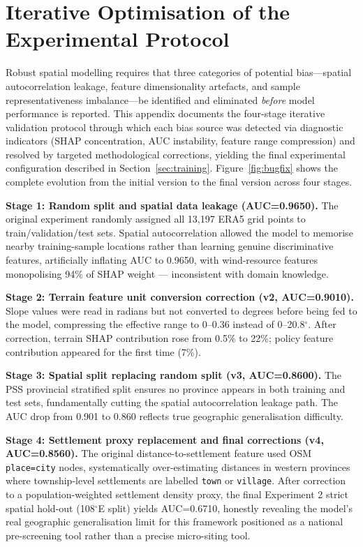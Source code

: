 \documentclass[12pt, a4paper]{article}
\begin{document}
\section{Iterative Optimisation of the Experimental Protocol}
\label{sec:appendix}

Robust spatial modelling requires that three categories of 
potential bias---spatial autocorrelation leakage, feature 
dimensionality artefacts, and sample representativeness 
imbalance---be identified and eliminated \textit{before} 
model performance is reported. This appendix documents the 
four-stage iterative validation protocol through which each 
bias source was detected via diagnostic indicators (SHAP 
concentration, AUC instability, feature range compression) 
and resolved by targeted methodological corrections, yielding 
the final experimental configuration described in 
Section~\ref{sec:training}.
Figure~\ref{fig:bugfix} shows the complete evolution from the
initial version to the final version across four stages.

\textbf{Stage 1: Random split and spatial data leakage
(AUC=0.9650).} The original experiment randomly assigned all
13,197 ERA5 grid points to train/validation/test sets.
Spatial autocorrelation allowed the model to memorise nearby
training-sample locations rather than learning genuine
discriminative features, artificially inflating AUC to 0.9650,
with wind-resource features monopolising 94\% of SHAP weight
--- inconsistent with domain knowledge.

\textbf{Stage 2: Terrain feature unit conversion correction
(v2, AUC=0.9010).} Slope values were read in radians but not
converted to degrees before being fed to the model, compressing
the effective range to 0--0.36 instead of 0--20.8$^\circ$.
After correction, terrain SHAP contribution rose from 0.5\%
to 22\%; policy feature contribution appeared for the first
time (7\%).

\textbf{Stage 3: Spatial split replacing random split
(v3, AUC=0.8600).} The PSS provincial stratified split ensures
no province appears in both training and test sets,
fundamentally cutting the spatial autocorrelation leakage
path. The AUC drop from 0.901 to 0.860 reflects true
geographic generalisation difficulty.

\textbf{Stage 4: Settlement proxy replacement and final
corrections (v4, AUC=0.8560).} The original
distance-to-settlement feature used OSM \texttt{place=city}
nodes, systematically over-estimating distances in western
provinces where township-level settlements are labelled
\texttt{town} or \texttt{village}. After correction to a
population-weighted settlement density proxy, the final
Experiment 2 strict spatial hold-out (108$^\circ$E split)
yields AUC=0.6710, honestly revealing the model's real
geographic generalisation limit for this framework positioned
as a national pre-screening tool rather than a precise
micro-siting tool.
\end{document}
